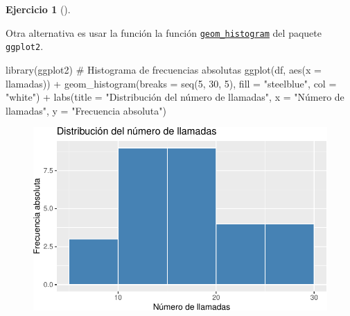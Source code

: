 \documentclass[
  a4paper,
]{scrreport}
\newenvironment{Shaded}{\begin{snugshade}}{\end{snugshade}}
\newcommand{\AttributeTok}[1]{\textcolor[rgb]{0.40,0.45,0.13}{#1}}
\newcommand{\CommentTok}[1]{\textcolor[rgb]{0.37,0.37,0.37}{#1}}
\newcommand{\DecValTok}[1]{\textcolor[rgb]{0.68,0.00,0.00}{#1}}
\newcommand{\FunctionTok}[1]{\textcolor[rgb]{0.28,0.35,0.67}{#1}}
\newcommand{\NormalTok}[1]{\textcolor[rgb]{0.00,0.23,0.31}{#1}}
\newcommand{\SpecialCharTok}[1]{\textcolor[rgb]{0.37,0.37,0.37}{#1}}
\newcommand{\StringTok}[1]{\textcolor[rgb]{0.13,0.47,0.30}{#1}}
\theoremstyle{definition}
\newtheorem{exercise}{Ejercicio}[chapter]
\theoremstyle{remark}
\begin{document}
\begin{exercise}[]
\begin{enumerate}
\begin{tcolorbox}
  Otra alternativa es usar la función la función
  \href{https://aprendeconalf.es/manual-r/07-graficos.html\#histogramas}{\texttt{geom\_histogram}}
  del paquete \texttt{ggplot2}.

\begin{Shaded}
\begin{Highlighting}[]
\FunctionTok{library}\NormalTok{(ggplot2)}
\CommentTok{\# Histograma de frecuencias absolutas}
\FunctionTok{ggplot}\NormalTok{(df, }\FunctionTok{aes}\NormalTok{(}\AttributeTok{x =}\NormalTok{ llamadas)) }\SpecialCharTok{+}
    \FunctionTok{geom\_histogram}\NormalTok{(}\AttributeTok{breaks =} \FunctionTok{seq}\NormalTok{(}\DecValTok{5}\NormalTok{, }\DecValTok{30}\NormalTok{, }\DecValTok{5}\NormalTok{), }\AttributeTok{fill =} \StringTok{"steelblue"}\NormalTok{, }\AttributeTok{col =} \StringTok{"white"}\NormalTok{) }\SpecialCharTok{+} 
    \FunctionTok{labs}\NormalTok{(}\AttributeTok{title =} \StringTok{"Distribución del número de llamadas"}\NormalTok{, }\AttributeTok{x =} \StringTok{"Número de llamadas"}\NormalTok{, }\AttributeTok{y =} \StringTok{"Frecuencia absoluta"}\NormalTok{)}
\end{Highlighting}
\end{Shaded}

  \begin{figure}[H]

  {\centering \includegraphics{03-frecuencias-graficos_files/figure-pdf/unnamed-chunk-19-1.pdf}

  }

  \end{figure}


\end{tcolorbox}
\end{enumerate}
\end{exercise}
\end{document}
